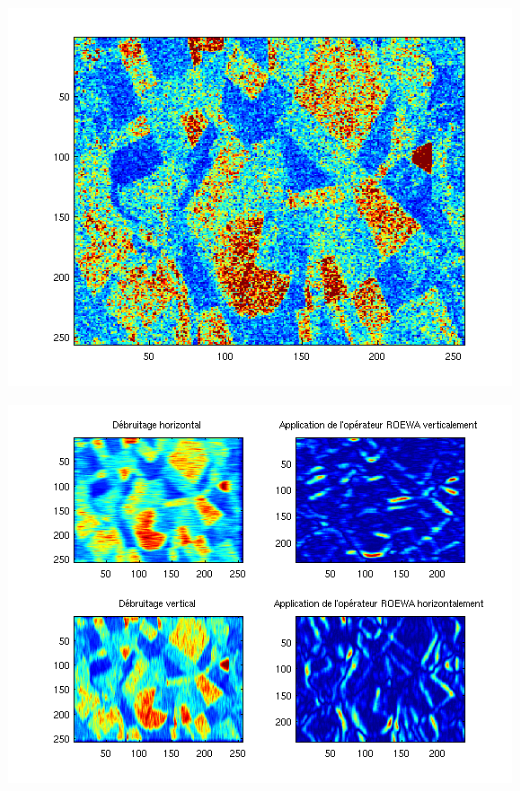 \documentclass{beamer}
\begin{document}
\begin{frame}
\begin{center}
\includegraphics[scale=0.6]{capture4/partie4_01.png}
\end{center}
\end{frame}

\begin{frame}
\begin{center}
\includegraphics[scale=0.6]{capture4/partie4_06.png}
\end{center}
\end{frame}
\end{document}

